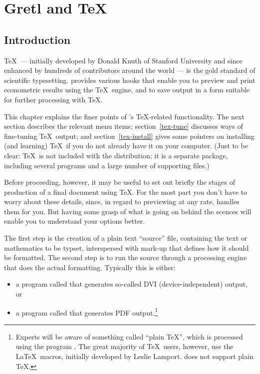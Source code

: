 \chapter{Gretl and \TeX}
\label{gretltex}


\section{Introduction}
\label{tex-intro}

\TeX\ --- initially developed by Donald Knuth of Stanford University
and since enhanced by hundreds of contributors around the world --- is
the gold standard of scientific typesetting.   provides
various hooks that enable you to preview and print econometric results
using the \TeX\ engine, and to save output in a form suitable for
further processing with \TeX.

This chapter explains the finer points of 's \TeX-related
functionality.  The next section describes the relevant menu items;
section~\ref{tex-tune} discusses ways of fine-tuning \TeX\ output; and
section~\ref{tex-install} gives some pointers on installing (and
learning) \TeX\ if you do not already have it on your computer.  (Just
to be clear: \TeX\ is not included with the  distribution;
it is a separate package, including several programs and a large
number of supporting files.)

Before proceeding, however, it may be useful to set out briefly the
stages of production of a final document using \TeX.  For the most
part you don't have to worry about these details, since, in regard to
previewing at any rate,  handles them for you.  But having
some grasp of what is going on behind the scences will enable you to
understand your options better.

The first step is the creation of a plain text ``source'' file,
containing the text or mathematics to be typset, interspersed with
mark-up that defines how it should be formatted.  The second step is
to run the source through a processing engine that does the actual
formatting.  Typically this is either:
\begin{itemize}
\item a program called  that generates so-called DVI
  (device-independent) output, or
\item a program called  that generates PDF
  output.\footnote{Experts will be aware of something called ``plain
    \TeX'', which is processed using the program .  The great
    majority of \TeX\ users, however, use the \LaTeX\ macros,
    initially developed by Leslie Lamport.   does not
    support plain \TeX.}
\end{itemize}

